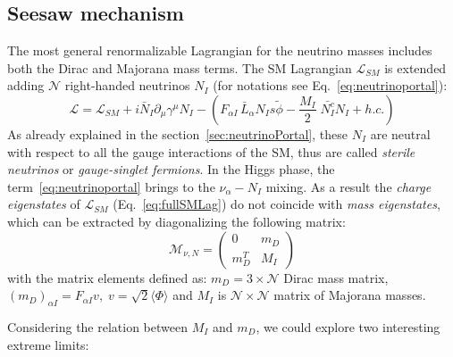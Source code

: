 \subsection{Seesaw mechanism}\label{sec:seesaw}
The most general renormalizable Lagrangian for the neutrino masses includes both the Dirac and Majorana mass terms. The SM Lagrangian $\mathcal{L}_{SM}$ is extended adding $\mathcal{N}$ right-handed neutrinos $N_I$ (for notations see Eq.~\ref{eq:neutrinoportal}):
\begin{equation}
\label{eq:fullSMLag}
 \mathcal{L} = \mathcal{L}_{SM}+ i \bar N_I \partial_\mu \gamma^\mu N_I -
  \left(F_{\alpha I} \,\bar L_\alpha N_Is \tilde \phi 
    - \frac{M_I}{2} \; \bar {N_I^c} N_I + h.c.\right)
\end{equation}
As already explained in the section~\ref{sec:neutrinoPortal}, these $N_I$ are neutral with respect to all the gauge interactions of the SM, thus are called \emph{sterile neutrinos} or \emph{gauge-singlet fermions}.
In the Higgs phase, the term~\ref{eq:neutrinoportal} brings to the $\nu_{\alpha} - N_I$ mixing. As a result the \emph{charge eigenstates} of $\mathcal{L}_{SM}$ (Eq.~\ref{eq:fullSMLag}) do not coincide with \emph{mass eigenstates}, which can be extracted by diagonalizing the following matrix:
\begin{equation}
\label{eq:matrixmass}
 \mathcal{M}_{\nu,N} = 
\begin{pmatrix}
0 & m_D\\
m^{T}_{D} & M_I
\end{pmatrix}
\end{equation}
with the matrix elements defined as: $m_D = 3 \times  \mathcal{N}$ Dirac mass matrix, $(m_D)_{\alpha I} = F_{\alpha I}v, \; v = \sqrt{2}\langle \Phi \rangle$ and $M_I$ is $\mathcal{N} \times \mathcal{N}$ matrix of Majorana masses.

Considering the relation between $M_I$ and $m_D$, we could explore two interesting extreme limits:
